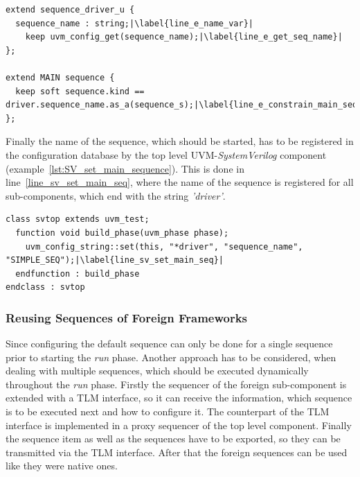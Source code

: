 \lstset{language=e, numbers = left, escapechar=|, breaklines=true}
\begin{lstlisting}[frame=htrbl, caption={\textit{e}: getting the \emph{main} sequence from configuration database},
label={lst:e_get_main_sequence}]
extend sequence_driver_u {
  sequence_name : string;|\label{line_e_name_var}|
    keep uvm_config_get(sequence_name);|\label{line_e_get_seq_name}|
};

extend MAIN sequence {
  keep soft sequence.kind == driver.sequence_name.as_a(sequence_s);|\label{line_e_constrain_main_seq}|
};
\end{lstlisting}
Finally the name of the sequence, which should be started, has to be registered in the configuration database by the top level UVM-\emph{SystemVerilog} component (example~\ref{lst:SV_set_main_sequence}). This is done in line~\ref{line_sv_set_main_seq}, where the name of the sequence is registered for all sub-components, which end with the string \emph{'driver'}.
\lstset{language=SystemVerilog, numbers = left, escapechar=|, breaklines=true}
\begin{lstlisting}[frame=htrbl, caption={SystemVerilog: setting the default sequence via configuration database},
label={lst:SV_set_main_sequence}]
class svtop extends uvm_test;
  function void build_phase(uvm_phase phase);
    uvm_config_string::set(this, "*driver", "sequence_name", "SIMPLE_SEQ");|\label{line_sv_set_main_seq}|
  endfunction : build_phase
endclass : svtop
\end{lstlisting}
\subsubsection{Reusing Sequences of Foreign Frameworks}
Since configuring the default sequence can only be done for a single sequence prior to starting the \emph{run} phase. Another approach has to be considered, when dealing with multiple sequences, which should be executed dynamically throughout the \emph{run} phase. Firstly the sequencer of the foreign sub-component is extended with a TLM interface, so it can receive the information, which sequence is to be executed next and how to configure it. The counterpart of the TLM interface is implemented in a proxy sequencer of the top level component. Finally the sequence item as well as the sequences have to be exported, so they can be transmitted via the TLM interface. After that the foreign sequences can be used like they were native ones.
